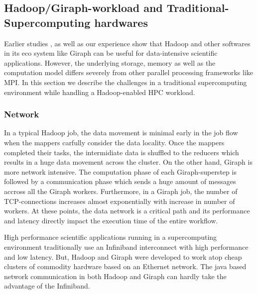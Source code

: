 \documentclass[conference]{IEEEtran}
\begin{document}
\subsection {Hadoop/Giraph-workload and Traditional-Supercomputing hardwares}
Earlier studies \cite{schadoop:fadika}, \cite{schadoop:matsunaga} as well as our experience show that Hadoop and other softwares in its eco system like Giraph can be useful for data-intensive scientific applications. However, the underlying storage, memory as well as the computation model differs severely from other parallel processing frameworks like MPI.
In this section we describe the challenges in a traditional supercomputing environment while handling a Hadoop-enabled HPC workload.
\subsubsection {Network}
In a typical Hadoop job, the data movement is minimal early in the job flow when the mappers carfully consider the data locality. 
Once the mappers completed their tasks, the intermidiate data is shuffled to the reducers which results in a huge data movement across the cluster. 
On the other hand,  Giraph is more network intensive. The computation phase of each Giraph-superstep is followed by a communication phase which sends a huge amount of messages accross all the Giraph workers.
Furthermore, in a Giraph job, the number of TCP-connections increases almost exponentially with increase in number of workers.
At these points, the data network is a critical path and its performance and latency directly impact the execution time of the entire workflow.

High performance scientific applications running in a supercomputing environment traditionally use an Infiniband interconnect with high performance and low latency.
But, Hadoop and Giraph were developed to work atop cheap clusters of commodity hardware based on an Ethernet network.
The java based network communication in both Hadoop and Giraph can hardly take the advantage of the Infiniband.
\end{document}
